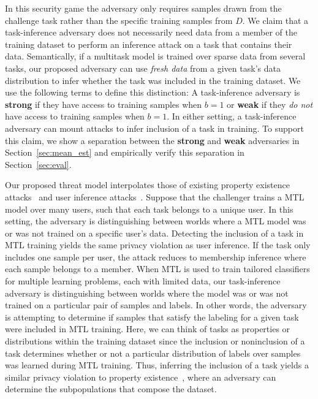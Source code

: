 In this security game the adversary only requires samples drawn from the challenge task rather than the specific training samples from $D$. We claim that a task-inference adversary does not necessarily need data from a member of the training dataset to perform an inference attack on a task that contains their data. Semantically, if a multitask model is trained over sparse data from several tasks, our proposed adversary can use \textit{fresh data} from a given task's data distribution to infer whether the task was included in the training dataset. We use the following terms to define this distinction: A task-inference adversary is \textbf{strong} if they have access to training samples when $b=1$ or \textbf{weak} if they \emph{do not} have access to training samples when $b=1$. In either setting, a task-inference adversary can mount attacks to infer inclusion of a task in training. To support this claim, we show a separation between the \textbf{strong} and \textbf{weak} adversaries in Section~\ref{sec:mean_est} and empirically verify this separation in Section~\ref{sec:eval}. 

Our proposed threat model interpolates those of existing property existence attacks~\cite{chaudhari-2022-snap} and user inference attacks~\cite{kandpal2023userinference}. Suppose that the challenger trains a MTL model over many users, such that each task belongs to a unique user.  In this setting, the adversary is distinguishing between worlds where a MTL model was or was not trained on a specific user's data. Detecting the inclusion of a task in MTL training yields the same privacy violation as user inference. If the task only includes one sample per user, the attack reduces to membership inference where each sample belongs to a member. When MTL is used to train tailored classifiers for multiple learning problems, each with limited data, our task-inference adversary is distinguishing between worlds where the model was or was not trained on a particular pair of samples and labels. In other words, the adversary is attempting to determine if samples that satisfy the labeling for a given task were included in MTL training. Here, we can think of tasks as properties or distributions within the training dataset since the inclusion or noninclusion of a task determines whether or not a particular distribution of labels over samples was learned during MTL training. Thus, inferring the inclusion of a task yields a similar privacy violation to property existence~\cite{chaudhari-2022-snap}, where an adversary can determine the subpopulations that compose the dataset. 


